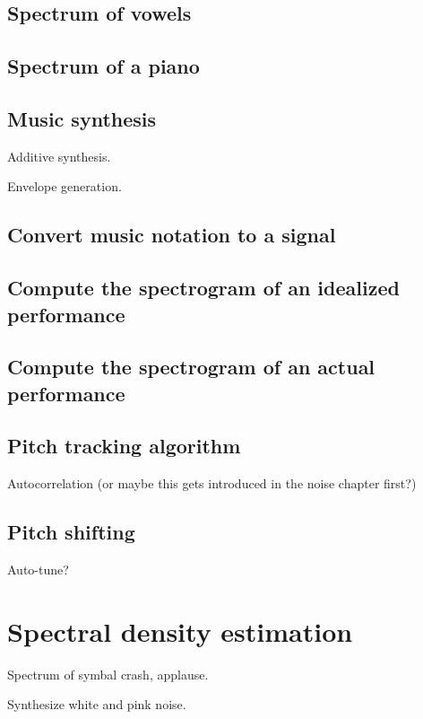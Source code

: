 \documentclass[12pt]{book}
\begin{document}
\section{Spectrum of vowels}

\section{Spectrum of a piano}

\section{Music synthesis}

Additive synthesis.

Envelope generation.

\section{Convert music notation to a signal}

\section{Compute the spectrogram of an idealized performance}

\section{Compute the spectrogram of an actual performance}

\section{Pitch tracking algorithm}

Autocorrelation (or maybe this gets introduced in the noise chapter first?)

\section{Pitch shifting}

Auto-tune?


\chapter{Spectral density estimation}

Spectrum of symbal crash, applause.

Synthesize white and pink noise.
\end{document}
